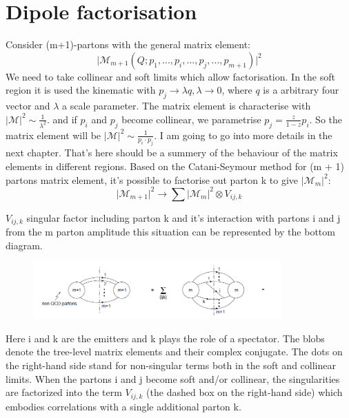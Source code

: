 \section*{Dipole factorisation }
Consider (m+1)-partons with the general matrix element:
\begin{equation}
\vert {{\mathcal{M}}}_{m+1} (Q; p_1,...,p_i,...,p_j,...,p_{m+1}) \vert^2
\end{equation}
We need to take collinear and soft limits which allow factorisation.
In the soft region it is used the kinematic with $ p_j \rightarrow \lambda q, \lambda \rightarrow 0 $, where $ q $ is a arbitrary four vector and $ \lambda $ a scale parameter. 
The matrix element is characterise with $ \vert {{\mathcal{M}}} \vert^2 \sim \frac{1}{\lambda^2}$. and if $ p_i $ and $ p_j $ become collinear, we parametrise $ p_j = \frac{z}{1-z} p_i $. So the matrix element will be $ \vert {{\mathcal{M}}} \vert^2 \sim \frac{1}{p_i \cdot p_j}$.
I am going to go into more details in the next chapter. That's here should be a summery of the behaviour of the matrix elements in different regions.
Based on the Catani-Seymour method for (m + 1) partons matrix element, it's possible to factorise out parton k to give $ \vert {{\mathcal{M}}}_{m}  \vert^2 $:
\begin{equation}
\vert {{\mathcal{M}}}_{m+1}  \vert^2 \rightarrow \sum \vert {{\mathcal{M}}}_{m}  \vert^2 \otimes V_{ij,k}
\end{equation}

$ V_{ij,k} $ singular factor including parton k and it's interaction with partons i and j from the m parton amplitude this situation can be represented by the bottom diagram.

\begin{figure}[h!]
\centering
\includegraphics[width=0.85\textwidth]{images/Intro/factorisationPic.png}
\end{figure}

Here i and k are the emitters and k plays the role of a spectator. The blobs denote the tree-level matrix elements and their complex conjugate. The dots on the right-hand side stand for non-singular terms both in the soft and collinear limits.
When the partons i and j become soft and/or collinear, the singularities are factorized into the term $ V_{ij,k} $ (the
dashed box on the right-hand side) which embodies correlations with a single additional parton k.

